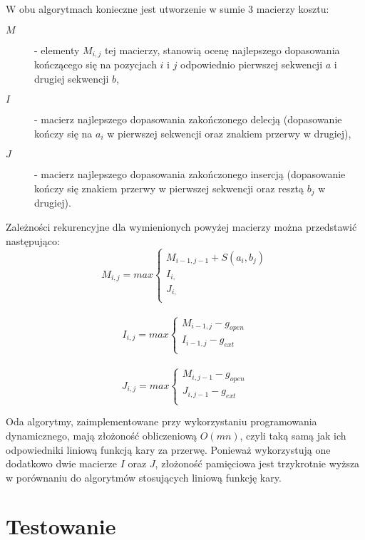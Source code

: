 \documentclass[a4paper,10pt]{article}
\begin{document}
	W obu algorytmach konieczne jest utworzenie w sumie 3 macierzy kosztu:
	\begin{description}
	\item[$M$]
	 - elementy $M_{i,j}$ tej macierzy, stanowią ocenę najlepszego dopasowania kończącego się na pozycjach $i$ i $j$ odpowiednio pierwszej sekwencji $a$ i drugiej sekwencji $b$,
	\item[$I$]
	 - macierz najlepszego dopasowania zakończonego delecją (dopasowanie kończy się na $a_i$ w pierwszej sekwencji oraz znakiem przerwy w drugiej),
	\item[$J$]
	 - macierz najlepszego dopasowania zakończonego insercją (dopasowanie kończy się znakiem przerwy w pierwszej sekwencji oraz resztą $b_j$ w drugiej).
	\end{description}
	Zależności rekurencyjne dla wymienionych powyżej macierzy można przedstawić następująco:
	\[
		M_{i,j} = max \left\{
			\begin{array}{ll}
				M_{i-1, j-1} + S(a_i, b_j)\\
				I_{i, }\\
				J_{i, }\\
			\end{array} \right.
	\]\\
	\[
		I_{i,j} = max \left\{
			\begin{array}{ll}
				M_{i-1, j} - g_{open}\\
				I_{i-1, j} - g_{ext}\\
			\end{array} \right.
	\]\\
	\[
		J_{i,j} = max \left\{
			\begin{array}{ll}
				M_{i, j-1} - g_{open}\\
				J_{i, j-1} - g_{ext}\\
			\end{array} \right.
	\]

	
	Oda algorytmy, zaimplementowane przy wykorzystaniu programowania dynamicznego, mają złożoność obliczeniową $O(mn)$, czyli taką samą jak ich odpowiedniki liniową funkcją kary za przerwę. Ponieważ wykorzystują one dodatkowo dwie macierze $I$ oraz $J$, złożoność pamięciowa jest trzykrotnie wyższa w porównaniu do algorytmów stosujących liniową funkcję kary.

	\section{Testowanie}
\end{document}
